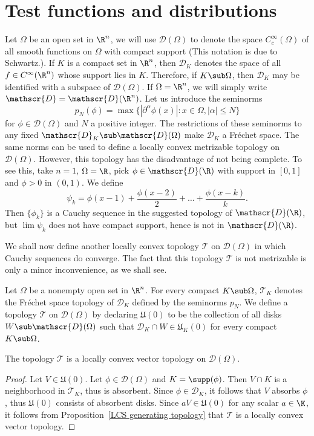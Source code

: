 \section{Test functions and distributions}
Let $\Omega$ be an open set in $\R^n$, we will use $\mathscr{D}(\Omega)$ to denote the space $C_c^\infty(\Omega)$ of all smooth functions on $\Omega$ with compact support (This notation is due to Schwartz.). If $K$ is a compact set in $\R^n$, then $\mathscr{D}_K$ denotes the space of all $f\in C^\infty(\R^n)$ whose support lies in $K$. Therefore, if $K\sub\Omega$, then $\mathscr{D}_K$ may be identified with a subspace of $\mathscr{D}(\Omega)$. If $\Omega=\R^n$, we will simply write $\mathscr{D}=\mathscr{D}(\R^n)$. Let us introduce the seminorms
\[p_N(\phi)=\max\{|\partial^\alpha\phi(x)|:x\in\Omega,|\alpha|\leq N\}\]
for $\phi\in\mathscr{D}(\Omega)$ and $N$ a positive integer. The restrictions of these seminorms to any fixed $\mathscr{D}_K\sub\mathscr{D}(\Omega)$ make $\mathscr{D}_K$ a Fr\'echet space. The same norms can be used to define a locally convex metrizable topology on $\mathscr{D}(\Omega)$. However, this topology has the disadvantage of not being complete. To see this, take $n=1$, $\Omega=\R$, pick $\phi\in\mathscr{D}(\R)$ with support in $[0,1]$ and $\phi>0$ in $(0,1)$. We define
\[\psi_k=\phi(x-1)+\frac{\phi(x-2)}{2}+\dots+\frac{\phi(x-k)}{k}.\]
Then $\{\phi_k\}$ is a Cauchy sequence in the suggested topology of $\mathscr{D}(\R)$, but $\lim\psi_k$ does not have compact support, hence is not in $\mathscr{D}(\R)$.\par
We shall now define another locally convex topology $\mathcal{T}$ on $\mathscr{D}(\Omega)$ in which Cauchy sequences do converge. The fact that this topology $\mathcal{T}$ is not metrizable is only a minor inconvenience, as we shall see.
\begin{definition}
Let $\Omega$ be a nonempty open set in $\R^n$. For every compact $K\sub\Omega$, $\mathcal{T}_K$ denotes the Fr\'echet space topology of $\mathscr{D}_K$ defined by the seminorms $p_N$. We define a topology $\mathcal{T}$ on $\mathscr{D}(\Omega)$ by declaring $\mathfrak{U}(0)$ to be the collection of all disks $W\sub\mathscr{D}(\Omega)$ such that $\mathscr{D}_K\cap W\in\mathfrak{U}_K(0)$ for every compact $K\sub\Omega$.
\end{definition}
\begin{proposition}
The topology $\mathcal{T}$ is a locally convex vector topology on $\mathscr{D}(\Omega)$.
\end{proposition}
\begin{proof}
Let $V\in\mathfrak{U}(0)$. Let $\phi\in\mathscr{D}(\Omega)$ and $K=\supp(\phi)$. Then $V\cap K$ is a neighborhood in $\mathcal{T}_K$, thus is absorbent. Since $\phi\in\mathscr{D}_K$, it follows that $V$ absorbs $\phi$, thus $\mathfrak{U}(0)$ consists of absorbent disks. Since $aV\in\mathfrak{U}(0)$ for any scalar $a\in\K$, it follows from Proposition~\ref{LCS generating topology} that $\mathcal{T}$ is a locally convex vector topology.
\end{proof}
